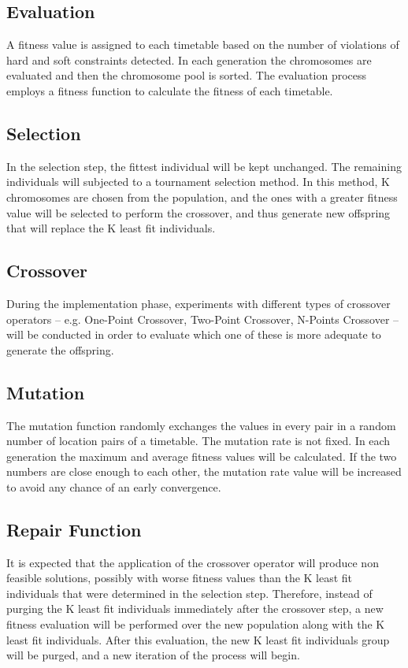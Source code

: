 \subsection{Evaluation}
\label{subsubsubsec:ga-evaluation}
A fitness value is assigned to each timetable based on the number of violations of hard and soft constraints detected. In each generation the chromosomes are evaluated and then the chromosome pool is sorted. The evaluation process employs a fitness function to calculate the fitness of each timetable.\\
\subsection{Selection}
\label{subsubsubsec:ga-selection}
In the selection step, the fittest individual will be kept unchanged. The remaining individuals will subjected to a tournament selection method. In this method, K chromosomes are chosen from the population, and the ones with a greater fitness value will be selected to perform the crossover, and thus generate new offspring that will replace the K least fit individuals.\\
\subsection{Crossover}
\label{subsubsubsec:ga-selection}
During the implementation phase, experiments with different types of crossover operators – e.g. One-Point Crossover, Two-Point Crossover, N-Points Crossover – will be conducted in order to evaluate which one of these is more adequate to generate the offspring.\\
\subsection{Mutation}
\label{subsubsubsec:ga-mutation}
The mutation function randomly exchanges the values in every pair in a random number of location pairs of a timetable. The mutation rate is not fixed. In each generation the maximum and average fitness values will be calculated. If the two numbers are close enough to each other, the mutation rate value will be increased to avoid any chance of an early convergence.\\
\subsection{Repair Function}
\label{subsubsubsec:ga-repairfunction}
It is expected that the application of the crossover operator will produce non feasible solutions, possibly with worse fitness values than the K least fit individuals that were determined in the selection step. Therefore, instead of purging the K least fit individuals immediately after the crossover step, a new fitness evaluation will be performed over the new population along with the K least fit individuals. After this evaluation, the new K least fit individuals group will be purged, and a new iteration of the process will begin.\\
